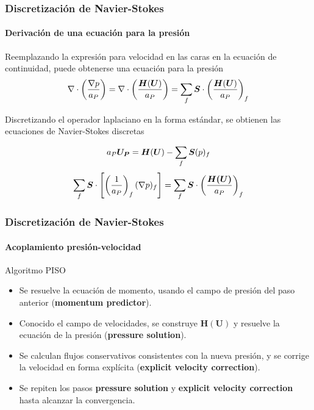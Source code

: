 \begin{frame}
    \frametitle{Discretizaci\'on de Navier-Stokes}
    \framesubtitle{Derivaci\'on de una ecuaci\'on para la presi\'on}
    
    Reemplazando la expresi\'on para velocidad en las caras en la ecuaci\'on de continuidad, puede obtenerse una ecuaci\'on para la presi\'on
    $$ \nabla \cdot \left( \frac{\nabla p}{a_P} \right) = \nabla \cdot \left( \frac{ \boldsymbol{H} (\boldsymbol{U})}{a_P} \right) = \sum_f \boldsymbol{S} \cdot \left( \frac{ \boldsymbol{H} (\boldsymbol{U})}{a_P} \right)_f$$

    Discretizando el operador laplaciano en la forma est\'andar, se obtienen las ecuaciones de Navier-Stokes discretas
    
    $$  a_P \boldsymbol{U_P} = \boldsymbol{H} (\boldsymbol{U}) - \sum_f \boldsymbol{S}(p)_f   $$    
    $$  \sum_f \boldsymbol{S} \cdot \left[ \left( \frac{1}{a_P}\right)_f  (\nabla p)_f\right] = \sum_f \boldsymbol{S} \cdot \left( \frac{\boldsymbol{H(\boldsymbol{U})}}{a_P} \right)_f   $$

\end{frame} 





\begin{frame}
    \frametitle{Discretizaci\'on de Navier-Stokes}
    \framesubtitle{Acoplamiento presi\'on-velocidad}
    
    \begin{block}{Algoritmo PISO}
        \begin{itemize}
            \item Se resuelve la ecuaci\'on de momento, usando el campo de presi\'on del paso anterior ({\bf momentum predictor}).
            \item Conocido el campo de velocidades, se construye $\mathbf{H}(\mathbf{U})$ y resuelve la ecuaci\'on de la presi\'on ({\bf pressure solution}).
            \item Se calculan flujos conservativos consistentes con la nueva presi\'on, y se corrige la velocidad en forma expl\'icita ({\bf explicit velocity correction}).
            \item Se repiten los pasos \textbf{pressure solution} y \textbf{explicit velocity correction} hasta alcanzar la convergencia.
        \end{itemize}
    \end{block}     

\end{frame} 


